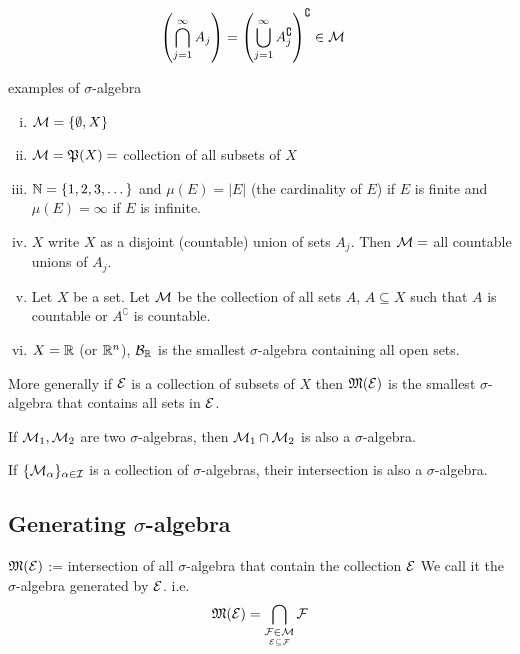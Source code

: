 \begin{remark}
  \begin{align*}
    \left(\bigcap_{j=1}^\infty A_j\right) &= \left(\bigcup_{j=1}^\infty A_j^\complement\right)^\complement \in \mathcal M
  \end{align*} 
\end{remark}
\begin{example}
  examples of $\sigma$-algebra
  \begin{enumerate}[(i)]
    \item $\mathcal M = \{\emptyset, X\}$ 
    \item $\mathcal M = \mathfrak P(X) = $ collection of all subsets of $X$
    \item[] $\mathbb N = \{1, 2, 3, \dotsc\}$ and $\mu(E) = |E|$ (the cardinality of $E$) if $E$ is finite and 
    $\mu(E) = \infty$ if $E$ is infinite.
    \item $X$ write $X$ as a disjoint (countable) union of sets $A_j$. Then
    $\mathcal M = $ all countable unions of $A_j$. 
    \item Let $X$ be a set. Let $\mathcal M$ be the collection of all sets $A$, $A \subseteq X$ such that
    $A$ is countable or $A^\complement$ is countable.
    \item $X = \mathbb R$ (or $\mathbb R^n$), $\mathcal B_\mathbb R$ is the smallest $\sigma$-algebra containing all open sets.
  \end{enumerate}
\end{example}

More generally if $\mathcal E$ is a collection of subsets of $X$ then $\mathfrak M(\mathcal E)$ is the smallest
$\sigma$-algebra that contains all sets in $\mathcal E$.

If $\mathcal M_1, \mathcal M_2$ are two $\sigma$-algebras, then $\mathcal M_1 \cap \mathcal M_2$ is also a 
$\sigma$-algebra.

If $\{\mathcal M_\alpha\}_{\alpha \in \mathcal{I}}$ is a collection of $\sigma$-algebras, their intersection is also a $\sigma$-algebra.

\subsection{Generating $\sigma$-algebra}

\begin{definition}
$\mathfrak M(\mathcal E)$ := intersection of all $\sigma$-algebra that contain the collection $\mathcal E$
We call it the $\sigma$-algebra generated by $\mathcal E$. i.e.
\[\mathfrak M(\mathcal E) = \bigcap_{\underset{\mathcal E \subseteq \mathcal F}{\mathcal F \in \mathcal M}} \mathcal F\]
\end{definition}

